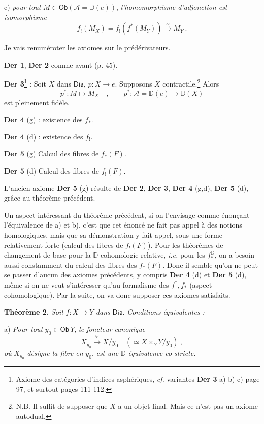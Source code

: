 \documentclass[11pt,leqno]{article}
\newcommand{\printedpage}[1]{\marginpar{\footnotesize p.~#1}}
\newcommand{\msp}[1]{\marginpar{\footnotesize [#1]}}
\newcommand{\Dia}{\mathsf{Dia}}
\newcommand{\Ob}{\mathsf{Ob}}
\newcommand{\isoto}{\overset{\sim}{\to}}
\newcommand{\D}{\mathbb{D}}
\begin{document}
c) \textit{pour tout} $M \in \Ob(\mathcal{A} = \D(e))$, \textit{l'homomorphisme d'adjonction est} \textit{isomorphisme}
\[
f_!(M_X) = f_!(f^*(M_Y)) \isoto M_Y \ .
\]

Je vais renuméroter les axiomes sur le prédérivateurs. %

\noindent\textbf{Der 1}, \textbf{Der 2} comme avant (p. 45).

\noindent\textbf{Der 3}\footnote[28]{Axiome des catégories d'indices asphériques, \textit{cf.} variantes \textbf{Der 3} a) b) c) page 97, et surtout pages 111-112.} : Soit $X$ dans $\Dia$, $p : X \to e$. Supposons $X$ contractile.\footnote[29]{N.B. Il suffit de supposer que $X$ a un objet final. Mais ce n'est pas un axiome autodual.} Alors
\[
p^* : M \longmapsto M_X \quad , \qquad p^* : \mathcal{A} = \D(e) \longrightarrow \D(X)
\]
est pleinement fidèle.

\printedpage{40}
\msp{page 68}

\noindent\textbf{Der 4} (g) : existence des $f_*$.

\noindent\textbf{Der 4} (d) : existence des $f_!$.

\noindent\textbf{Der 5} (g) Calcul des fibres de $f_*(F)$.

\noindent\textbf{Der 5} (d) Calcul des fibres de $f_!(F)$.

\noindent L'ancien axiome \textbf{Der 5} (g) résulte de \textbf{Der 2}, \textbf{Der 3}, \textbf{Der 4} (g,d), \textbf{Der 5} (d), grâce au théorème précédent.

Un aspect intéressant du théorème précédent, si on l'envisage comme énonçant l'équivalence de a) et b), c'est que cet énoncé ne fait pas appel à des notions homologiques, mais que sa démonstration y fait appel, sous une forme relativement forte (calcul des fibres de $f_!(F)$). Pour les théorèmes de changement de base pour la $\D$-cohomologie relative, \textit{i.e.} pour les $f_*^{\D}$, on a besoin aussi constamment du calcul des fibres des $f_*(F)$. Donc il semble qu'on ne peut se passer d'aucun des axiomes précédents, y compris \textbf{Der 4} (d) et \textbf{Der 5} (d), même si on ne veut s'intéresser qu'au formalisme des $f^*, f_*$ (aspect cohomologique). Par la suite, on va donc supposer ces axiomes satisfaits.

\noindent\textbf{Théorème 2.} \textit{Soit} $f : X \to Y$ \textit{dans} $\Dia$. \textit{Conditions équivalentes :}

a) \textit{Pour tout} $y_0 \in \Ob\, Y$, \textit{le foncteur canonique}
\[
X_{y_0} \overset{\varphi}{\longrightarrow} X/y_0 \quad (\simeq X \times_Y Y/y_0) \ ,
\]
\textit{où} $X_{y_0}$ \textit{désigne la fibre en} $y_0$, \textit{est une} $\D$\textit{-équivalence co-stricte.}
\end{document}
